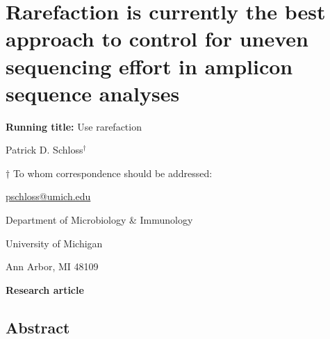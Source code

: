 \documentclass[
]{article}
\author{}
\date{\vspace{-2.5em}}
\begin{document}
\raggedright

\hypertarget{rarefaction-is-currently-the-best-approach-to-control-for-uneven-sequencing-effort-in-amplicon-sequence-analyses}{%
\section{Rarefaction is currently the best approach to control for
uneven sequencing effort in amplicon sequence
analyses}\label{rarefaction-is-currently-the-best-approach-to-control-for-uneven-sequencing-effort-in-amplicon-sequence-analyses}}

\vspace{20mm}

\textbf{Running title:} Use rarefaction

\vspace{20mm}

Patrick D. Schloss\({^\dagger}\)

\vspace{40mm}

\({\dagger}\) To whom correspondence should be addressed:

\href{mailto:pschloss@umich.edu}{pschloss@umich.edu}

Department of Microbiology \& Immunology

University of Michigan

Ann Arbor, MI 48109

\vspace{20mm}

\textbf{Research article}

\newpage

\hypertarget{abstract}{%
\subsection{Abstract}\label{abstract}}
\end{document}
